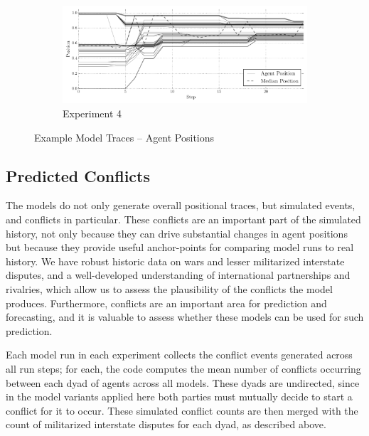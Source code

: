 \begin{figure}[!htbp]
    \begin{subfigure}[t]{0.75\textwidth}
        \includegraphics[width=\textwidth]{ColdWar/Figures/Exp4_agent_traces}
        \caption{Experiment 4}
    \end{subfigure}

    \caption{Example Model Traces -- Agent Positions}
    \label{fig:example_agent_traces}
    \figSpace
\end{figure}

\subsection{Predicted Conflicts}

The models do not only generate overall positional traces, but simulated events, and conflicts in particular. These conflicts are an important part of the simulated history, not only because they can drive substantial changes in agent positions but because they provide useful anchor-points for comparing model runs to real history. We have robust historic data on wars and lesser militarized interstate disputes, and a well-developed understanding of international partnerships and rivalries, which allow us to assess the plausibility of the conflicts the model produces. Furthermore, conflicts are an important area for prediction and forecasting, and it is valuable to assess whether these models can be used for such prediction.

Each model run in each experiment collects the conflict events generated across all run steps; for each, the code computes the mean number of conflicts occurring between each dyad of agents across all models. These dyads are undirected, since in the model variants applied here both parties must mutually decide to start a conflict for it to occur. These simulated conflict counts are then merged with the count of militarized interstate disputes for each dyad, as described above.

